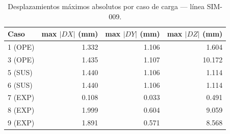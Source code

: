\begin{table}[htbp]
  \centering
  \small
  \caption{Desplazamientos máximos absolutos por caso de carga — línea SIM-009.}
  \label{tab:desplaz-max}
  \begin{tabular}{lrrr}
    \toprule
    Caso & max $|DX|$ (\si{mm}) & max $|DY|$ (\si{mm}) & max $|DZ|$ (\si{mm}) \\
    \midrule
    1 (OPE) & 1.332 & 1.106 & 1.604 \\
    3 (OPE) & 1.435 & 1.107 & 10.172 \\
    5 (SUS) & 1.440 & 1.106 & 1.114 \\
    6 (SUS) & 1.440 & 1.106 & 1.114 \\
    7 (EXP) & 0.108 & 0.033 & 0.491 \\
    8 (EXP) & 1.999 & 0.604 & 9.059 \\
    9 (EXP) & 1.891 & 0.571 & 8.568 \\
    \bottomrule
  \end{tabular}
\end{table}
